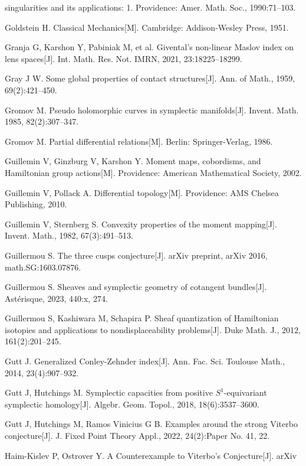 \begin{enumerate}[label={[\arabic*]},leftmargin=3.2em,itemsep=2pt,parsep=0pt]
        singularities and its applications: 1. Providence: Amer. Math. Soc., 1990:71--103.
  \item Goldstein H. Classical Mechanics[M]. Cambridge: Addison-Wesley Press, 1951.
  \item Granja G, Karshon Y, Pabiniak M, et al. Givental's non-linear Maslov index on lens
        spaces[J]. Int. Math. Res. Not. IMRN, 2021, 23:18225--18299.
  \item Gray J W. Some global properties of contact structures[J]. Ann. of Math., 1959,
        69(2):421--450.
  \item Gromov M. Pseudo holomorphic curves in symplectic manifolds[J]. Invent. Math.
        1985, 82(2):307--347.
  \item Gromov M. Partial differential relations[M]. Berlin: Springer-Verlag, 1986.
  \item Guillemin V, Ginzburg V, Karshon Y. Moment maps, cobordisms, and Hamiltonian group
        actions[M]. Providence: American Mathematical Society, 2002.
  \item Guillemin V, Pollack A. Differential topology[M]. Providence: AMS Chelsea
        Publishing, 2010.
  \item Guillemin V, Sternberg S. Convexity properties of the moment mapping[J].
        Invent. Math., 1982, 67(3):491--513.
  \item Guillermou S. The three cusps conjecture[J]. arXiv preprint, arXiv 2016,
        math.SG:1603.07876.
  \item Guillermou S. Sheaves and symplectic geometry of cotangent bundles[J]. Astérisque,
        2023, 440:x, 274.
  \item Guillermou S, Kashiwara M, Schapira P. Sheaf quantization of Hamiltonian isotopies
        and applications to nondisplaceability problems[J]. Duke Math. J., 2012,
        161(2):201--245.
  \item Gutt J. Generalized Conley-Zehnder index[J]. Ann. Fac. Sci. Toulouse Math., 2014,
        23(4):907--932.
  \item Gutt J, Hutchings M. Symplectic capacities from positive $S^1$-equivariant symplectic
        homology[J]. Algebr. Geom. Topol., 2018, 18(6):3537--3600.
  \item Gutt J, Hutchings M, Ramos Vinicius G B. Examples around the strong Viterbo
        conjecture[J]. J. Fixed Point Theory Appl., 2022, 24(2):Paper No. 41, 22.
  \item Haim-Kislev P, Ostrover Y. A Counterexample to Viterbo's Conjecture[J]. arXiv

\end{enumerate}
